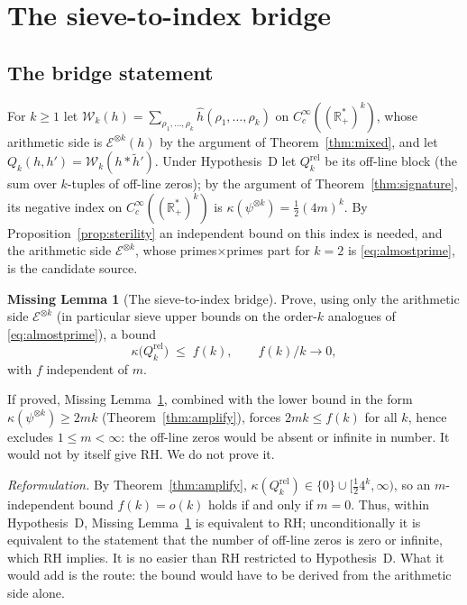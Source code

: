 \documentclass[11pt]{amsart}
\theoremstyle{definition}
\newtheorem{missinglemma}[theorem]{Missing Lemma}
\theoremstyle{remark}
\newcommand{\bbR}{\mathbb{R}}
\newcommand{\Rp}{\bbR_+^*}
\newcommand{\Ecal}{\mathcal{E}}
\begin{document}
\section{The sieve-to-index bridge}\label{sec:bridge}

\subsection{The bridge statement}
For $k\ge1$ let $\mathcal W_k(h)=\sum_{\rho_1,\dots,\rho_k}\hat h(\rho_1,\dots,\rho_k)$ on
$C_c^\infty((\Rp)^k)$, whose arithmetic side is $\Ecal^{\otimes k}(h)$ by the argument of
Theorem~\ref{thm:mixed}, and let $Q_k(h,h')=\mathcal W_k(h*\tilde h')$. Under Hypothesis~D let
$Q_k^{\mathrm{rel}}$ be its off-line block (the sum over $k$-tuples of off-line zeros); by the
argument of Theorem~\ref{thm:signature}, its negative index on $C_c^\infty((\Rp)^k)$ is
$\kappa(\psi^{\otimes k})=\tfrac12(4m)^k$. By Proposition~\ref{prop:sterility} an
independent bound on this index is needed, and the arithmetic side $\Ecal^{\otimes k}$, whose
primes$\times$primes part for $k=2$ is \eqref{eq:almostprime}, is the candidate source.

\begin{missinglemma}[The sieve-to-index bridge]\label{ml:bridge}
Prove, using only the arithmetic side $\Ecal^{\otimes k}$ (in particular sieve upper bounds on
the order-$k$ analogues of \eqref{eq:almostprime}), a bound
\[
\kappa\bigl(Q_k^{\mathrm{rel}}\bigr)\;\le\;f(k),\qquad f(k)/k\to0,
\]
with $f$ independent of $m$.
\end{missinglemma}

If proved, Missing Lemma~\ref{ml:bridge}, combined with the lower bound in the form
$\kappa(\psi^{\otimes k})\ge 2mk$ (Theorem~\ref{thm:amplify}), forces $2mk\le f(k)$
for all $k$, hence excludes $1\le m<\infty$: the off-line zeros would be absent or infinite
in number. It would not by itself give RH. We do not prove it.

\emph{Reformulation.} By Theorem~\ref{thm:amplify},
$\kappa(Q_k^{\mathrm{rel}})\in\{0\}\cup[\tfrac12 4^k,\infty)$, so an $m$-independent bound
$f(k)=o(k)$ holds if and only if $m=0$. Thus, within Hypothesis~D, Missing
Lemma~\ref{ml:bridge} is equivalent to RH; unconditionally it is equivalent to the statement
that the number of off-line zeros is zero or infinite, which RH implies. It is no easier than
RH restricted to Hypothesis~D. What it would add is
the route: the bound would have to be derived from the arithmetic side alone.
\end{document}

